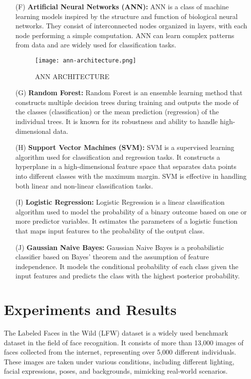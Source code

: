 \documentclass[a4paper]{article}
\theoremstyle{plain}
\theoremstyle{definition}
\begin{document}
\begin{enumerate}
\item[(F)] \textbf{Artificial Neural Networks (ANN):}
ANN is a class of machine learning models inspired by the structure and function of biological neural networks. They consist of interconnected nodes organized in layers, with each node performing a simple computation. ANN can learn complex patterns from data and are widely used for classification tasks.
\begin{figure}[htbp]
                \centering
                \texttt{[image: ann-architecture.png]} %
                \caption{ANN ARCHITECTURE}
                \label{fig:example}
                \end{figure}
\item[(G)] \textbf{Random Forest:}
Random Forest is an ensemble learning method that constructs multiple decision trees during training and outputs the mode of the classes (classification) or the mean prediction (regression) of the individual trees. It is known for its robustness and ability to handle high-dimensional data.
\item[(H)] \textbf{Support Vector Machines (SVM):}
SVM is a supervised learning algorithm used for classification and regression tasks. It constructs a hyperplane in a high-dimensional feature space that separates data points into different classes with the maximum margin. SVM is effective in handling both linear and non-linear classification tasks.
\item[(I)] \textbf{Logistic Regression:}
Logistic Regression is a linear classification algorithm used to model the probability of a binary outcome based on one or more predictor variables. It estimates the parameters of a logistic function that maps input features to the probability of the output class.
\item[(J)] \textbf{Gaussian Naive Bayes:}
Gaussian Naive Bayes is a probabilistic classifier based on Bayes' theorem and the assumption of feature independence. It models the conditional probability of each class given the input features and predicts the class with the highest posterior probability.
 \end{enumerate}
	\newpage

	
	\section{Experiments and Results}
	\label{sec:app}
	The Labeled Faces in the Wild (LFW) dataset is a widely used benchmark dataset in the field of face recognition. It consists of more than 13,000 images of faces collected from the internet, representing over 5,000 different individuals. These images are taken under various conditions, including different lighting, facial expressions, poses, and backgrounds, mimicking real-world scenarios.\vspace{8pt}
\end{document}
